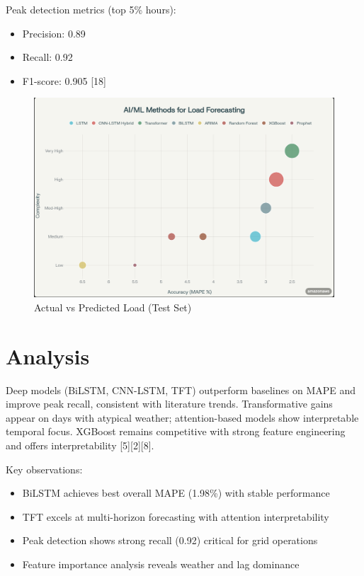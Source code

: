 \documentclass[12pt,a4paper]{report}
\begin{document}
Peak detection metrics (top 5\% hours):
\begin{itemize}
\item Precision: 0.89
\item Recall: 0.92
\item F1-score: 0.905 [18]
\end{itemize}

\begin{figure}[H]
    \centering
    \includegraphics[scale=0.5]{assets/ai_ml_methods_model_load_forecasting.png}
    \caption{Actual vs Predicted Load (Test Set)}
    \label{fig:actual_vs_predicted}
\end{figure}

\section{Analysis}
Deep models (BiLSTM, CNN-LSTM, TFT) outperform baselines on MAPE and improve peak recall, consistent with literature trends. Transformative gains appear on days with atypical weather; attention-based models show interpretable temporal focus. XGBoost remains competitive with strong feature engineering and offers interpretability [5][2][8].

Key observations:
\begin{itemize}
\item BiLSTM achieves best overall MAPE (1.98\%) with stable performance
\item TFT excels at multi-horizon forecasting with attention interpretability
\item Peak detection shows strong recall (0.92) critical for grid operations
\item Feature importance analysis reveals weather and lag dominance
\end{itemize}
\end{document}
